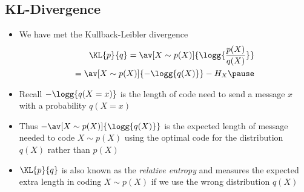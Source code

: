 \Outline %

\begin{slide}
\section[-2]{KL-Divergence}

\begin{PauseHighLight}
  \begin{itemize}
  \item We have met the Kullback-Leibler  divergence
    \begin{align*}
      \KL{p}{q} = \av[X\sim p(X)]{\logg{\frac{p(X)}{q(X)}}} \\
      = \av[X\sim p(X)]{-\logg{q(X)}} - H_X\pause
    \end{align*}
  \item Recall $-\logg{q(X=x)}$ is the length of code need to send a
    message $x$ with a probability $q(X=x)$\pause
  \item  Thus $-\av[X\sim p(X)]{\logg{q(X)}}$ is the expected length of
    message needed to code $X\sim p(X)$ using the optimal code for the
    distribution $q(X)$ rather than $p(X)$\pause
  \item $\KL{p}{q}$ is also known as the \emph{relative entropy}
    and measures the expected extra length in coding $X\sim p(X)$ if
    we use the wrong distribution $q(X)$\pause
  \end{itemize}
\end{PauseHighLight}

\end{slide}


